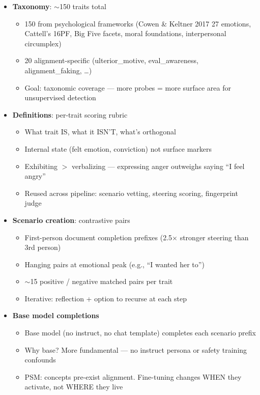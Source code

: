 \documentclass[11pt]{article}
\begin{document}
\begin{itemize}
  \item \textbf{Taxonomy}: $\sim$150 traits total
  \begin{itemize}
    \item 150 from psychological frameworks (Cowen \& Keltner 2017 27 emotions, Cattell's 16PF, Big Five facets, moral foundations, interpersonal circumplex)
    \item 20 alignment-specific (ulterior\_motive, eval\_awareness, alignment\_faking, \ldots)
    \item Goal: taxonomic coverage --- more probes = more surface area for unsupervised detection
  \end{itemize}

  \item \textbf{Definitions}: per-trait scoring rubric
  \begin{itemize}
    \item What trait IS, what it ISN'T, what's orthogonal
    \item Internal state (felt emotion, conviction) not surface markers
    \item Exhibiting $>$ verbalizing --- expressing anger outweighs saying ``I feel angry''
    \item Reused across pipeline: scenario vetting, steering scoring, fingerprint judge
  \end{itemize}

  \item \textbf{Scenario creation}: contrastive pairs
  \begin{itemize}
    \item First-person document completion prefixes (2.5$\times$ stronger steering than 3rd person)
    \item Hanging pairs at emotional peak (e.g., ``I wanted her to'')
    \item $\sim$15 positive / negative matched pairs per trait
    \item Iterative: reflection + option to recurse at each step
  \end{itemize}

  \item \textbf{Base model completions}
  \begin{itemize}
    \item Base model (no instruct, no chat template) completes each scenario prefix
    \item Why base? More fundamental --- no instruct persona or safety training confounds
    \item PSM: concepts pre-exist alignment. Fine-tuning changes WHEN they activate, not WHERE they live
  \end{itemize}


\end{itemize}
\end{document}
